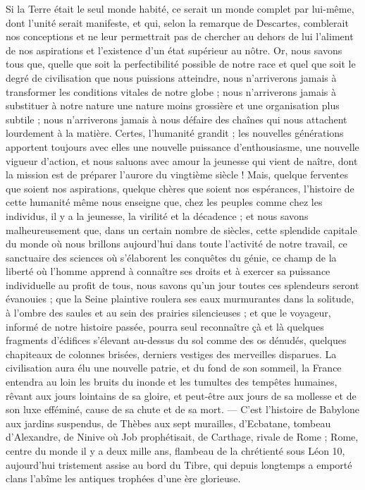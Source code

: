 \documentclass[a4paper, 11pt, oneside]{article}
\begin{document}
Si la Terre était le seul monde habité, ce serait un monde complet par lui-même, dont l'unité serait manifeste, et qui, selon la remarque de Descartes, comblerait nos conceptions et ne leur permettrait pas de chercher au dehors de lui l'aliment de nos aspirations et l'existence d'un état supérieur au nôtre. Or, nous savons tous que, quelle que soit la perfectibilité possible de notre race et quel que soit le degré de civilisation que nous puissions atteindre, nous n'arriverons jamais à transformer les conditions vitales de notre globe ; nous n'arriverons jamais à substituer à notre nature une nature moins grossière et une organisation plus subtile ; nous n'arriverons jamais à nous défaire des chaînes qui nous attachent lourdement à la matière. Certes, l'humanité grandit ; les nouvelles générations apportent toujours avec elles une nouvelle puissance d'enthousiasme, une nouvelle vigueur d'action, et nous saluons avec amour la jeunesse qui vient de naître, dont la mission est de préparer l'aurore du vingtième siècle ! Mais, quelque ferventes que soient nos aspirations, quelque chères que soient nos espérances, l'histoire de cette humanité même nous enseigne que, chez les peuples comme chez les individus, il y a la jeunesse, la virilité et la décadence ; et nous savons malheureusement que, dans un certain nombre de siècles, cette splendide capitale du monde où nous brillons aujourd'hui dans toute l'activité de notre travail, ce sanctuaire des sciences où s'élaborent les conquêtes du génie, ce champ de la liberté où l'homme apprend à connaître ses droits et à exercer sa puissance individuelle au profit de tous, nous savons qu'un jour toutes ces splendeurs seront évanouies ; que la Seine plaintive roulera ses eaux murmurantes dans la solitude, à l'ombre des saules et au sein des prairies silencieuses ; et que le voyageur, informé de notre histoire passée, pourra seul reconnaître çà et là quelques fragments d'édifices s'élevant au-dessus du sol comme des os dénudés, quelques chapiteaux de colonnes brisées, derniers vestiges des merveilles disparues. La civilisation aura élu une nouvelle patrie, et du fond de son sommeil, la France entendra au loin les bruits du inonde et les tumultes des tempêtes humaines, rêvant aux jours lointains de sa gloire, et peut-être aux jours de sa mollesse et de son luxe efféminé, cause de sa chute et de sa mort. --- C'est l'histoire de Babylone aux jardins suspendus, de Thèbes aux sept murailles, d'Ecbatane, tombeau d'Alexandre, de Ninive où Job prophétisait, de Carthage, rivale de Rome ; Rome, centre du monde il y a deux mille ans, flambeau de la chrétienté sous Léon 10, aujourd'hui tristement assise au bord du Tibre, qui depuis longtemps a emporté clans l'abîme les antiques trophées d'une ère glorieuse.
\end{document}
